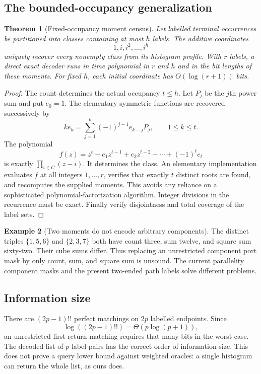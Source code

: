 \documentclass[11pt]{article}
\newtheorem{theorem}{Theorem}[section]
\theoremstyle{definition}\newtheorem{definition}[theorem]{Definition}\newtheorem{example}[theorem]{Example}
\theoremstyle{remark}\newtheorem{remark}[theorem]{Remark}
\begin{document}
\subsection{The bounded-occupancy generalization}
\begin{theorem}[Fixed-occupancy moment census]
\label{thm:bounded}
Let labelled terminal occurrences be partitioned into classes containing at most $h$ labels. The additive coordinates
\[
                          1,i,i^2,\ldots,i^h
\]
uniquely recover every nonempty class from its histogram profile. With $r$ labels, a direct exact decoder runs in time polynomial in $r$ and $h$ and in the bit lengths of these moments. For fixed $h$, each initial coordinate has $O(\log(r+1))$ bits.
\end{theorem}
\begin{proof}
The count determines the actual occupancy $t\le h$. Let $P_j$ be the $j$th power sum and put $e_0=1$. The elementary symmetric functions are recovered successively by
\[
                 k e_k=\sum_{j=1}^k(-1)^{j-1}e_{k-j}P_j,
                    \qquad 1\le k\le t.
\]
The polynomial
\[
           f(z)=z^t-e_1z^{t-1}+e_2z^{t-2}-\cdots+(-1)^te_t
\]
is exactly $\prod_{i\in C}(z-i)$. It determines the class. An elementary implementation evaluates $f$ at all integers $1,\ldots,r$, verifies that exactly $t$ distinct roots are found, and recomputes the supplied moments. This avoids any reliance on a sophisticated polynomial-factorization algorithm. Integer divisions in the recurrence must be exact. Finally verify disjointness and total coverage of the label sets.
\end{proof}

\begin{example}[Two moments do not encode arbitrary components]
The distinct triples $\{1,5,6\}$ and $\{2,3,7\}$ both have count three, sum twelve, and square sum sixty-two. Their cube sums differ. Thus replacing an unrestricted component port mask by only count, sum, and square sum is unsound. The current parallelity component masks and the present two-ended path labels solve different problems.
\end{example}

\subsection{Information size}
There are $(2p-1)!!$ perfect matchings on $2p$ labelled endpoints. Since
\[
       \log((2p-1)!!)=\Theta(p\log(p+1)),
\]
an unrestricted first-return matching requires that many bits in the worst case. The decoded list of $p$ label pairs has the correct order of information size. This does not prove a query lower bound against weighted oracles: a single histogram can return the whole list, as ours does.
\end{document}

